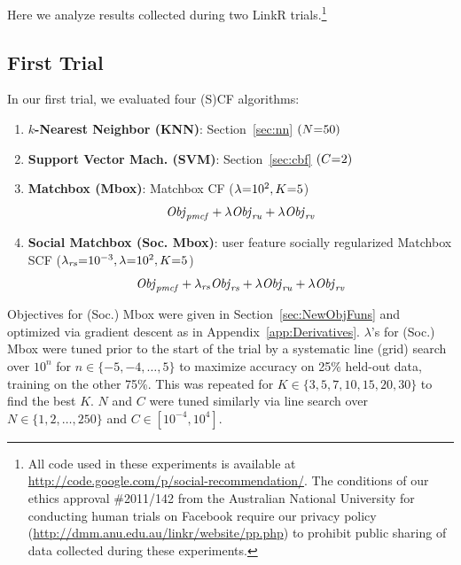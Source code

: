
Here we analyze results collected during two LinkR 
trials.\footnote{All code used in these experiments is available at
\url{http://code.google.com/p/social-recommendation/}.  The conditions
of our ethics approval \#2011/142 from the Australian National
University for conducting human trials on Facebook require our
privacy policy
(\url{http://dmm.anu.edu.au/linkr/website/pp.php}) to
prohibit public sharing of data collected during these experiments.}

\subsection{First Trial}

In our first trial, we evaluated four (S)CF algorithms:
\denselist
\begin{enumerate}
\item {\bf $k$-Nearest Neighbor (KNN)}: Section~\ref{sec:nn} $(N\hspace{-.9mm}=\hspace{-.9mm}50)$
\item {\bf Support Vector Mach. \sq(SVM)}: Section~\ref{sec:cbf} $(C\hspace{-.9mm}=\hspace{-.9mm}2)$
\item {\bf Matchbox (Mbox)}: Matchbox CF ($\lambda\hspace{-.9mm}=\hspace{-.9mm}10^2, K\hspace{-.9mm}=\hspace{-.9mm}5$) %
$$\mathit{Obj}_{\mathit{pmcf}} + \lambda \mathit{Obj}_{\mathit{ru}} + \lambda \mathit{Obj}_{\mathit{rv}}$$
\item {\bf Social Matchbox (Soc. \sqt Mbox)}: \sq
user feature socially regularized Matchbox SCF 
($\lambda_{\mathit{rs}}\hspace{-.9mm}=\hspace{-.9mm}10^{-3}, \lambda\hspace{-.9mm}=\hspace{-.9mm}10^2, K\hspace{-.9mm}=\hspace{-.9mm}5$)
$$\mathit{Obj}_{\mathit{pmcf}} + \lambda_{\mathit{rs}} \mathit{Obj}_{\mathit{rs}} + \lambda \mathit{Obj}_{\mathit{ru}} + \lambda \mathit{Obj}_{\mathit{rv}}$$
\end{enumerate}
Objectives for (Soc.) Mbox were given in Section~\ref{sec:NewObjFuns}
and optimized via gradient descent as in
Appendix~\ref{app:Derivatives}. $\lambda$'s for (Soc.) Mbox
were tuned prior to the start of the trial by a systematic line (grid)
search over $10^n$ for $n \in \{ -5,-4,\ldots,5 \}$ to maximize
accuracy on 25\% held-out data, training on the other 75\%.  This
was repeated for $K \in \{ 3,5,7,10,15,20,30 \}$ to find
the best $K$.  $N$ and $C$ were tuned similarly via line search
over $N \in \{ 1,2,\ldots,250 \}$ and $C
\in [10^{-4},10^4]$.

